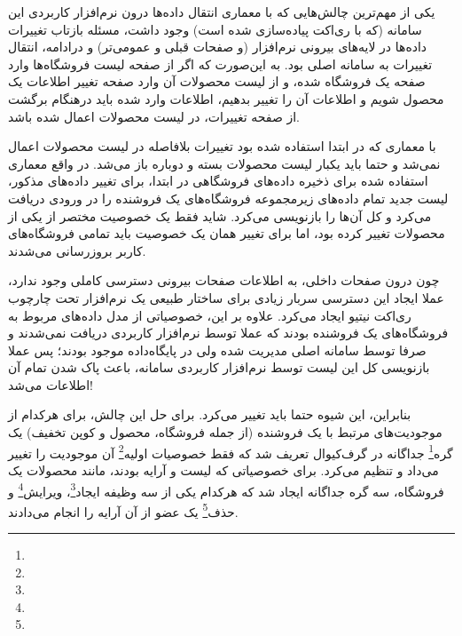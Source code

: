 

یکی از مهم‌ترین چالش‌هایی که با معماری انتقال داده‌ها درون نرم‌افزار کاربردی این سامانه (که با ری‌اکت پیاده‌سازی شده است) وجود داشت،‌ مسئله بازتاب تغییرات داده‌ها در لایه‌های بیرونی نرم‌افزار (و صفحات قبلی و عمومی‌تر) و درادامه، انتقال تغییرات به سامانه اصلی بود. به این‌صورت که اگر از صفحه لیست فروشگاه‌ها وارد صفحه یک فروشگاه شده، و از لیست محصولات آن وارد صفحه تغییر اطلاعات یک محصول شویم و اطلاعات آن را تغییر بدهیم، اطلاعات وارد شده باید درهنگام برگشت از صفحه تغییرات، در لیست محصولات اعمال شده باشد.

با معماری که در ابتدا استفاده شده بود تغییرات بلافاصله در لیست محصولات اعمال نمی‌شد و حتما باید یکبار لیست محصولات بسته و دوباره باز می‌شد. در واقع‌ معماری استفاده شده برای ذخیره داده‌های فروشگاهی در ابتدا، برای تغییر داده‌های مذکور، لیست جدید تمام داده‌های زیرمجموعه فروشگاه‌های یک فروشنده را در ورودی دریافت می‌کرد و کل آن‌ها را بازنویسی می‌کرد. شاید فقط یک خصوصیت مختصر از یکی از محصولات تغییر کرده بود، اما برای تغییر همان یک خصوصیت باید تمامی فروشگاه‌های کاربر بروزرسانی می‌شدند.

چون درون صفحات داخلی، به اطلاعات صفحات بیرونی دسترسی کاملی وجود ندارد،‌ عملا ایجاد این دسترسی سربار زیادی برای ساختار طبیعی یک نرم‌افزار تحت چارچوب ری‌اکت نیتیو ایجاد می‌کرد. علاوه بر این، خصوصیاتی از مدل داده‌های مربوط به فروشگاه‌های یک فروشنده بودند که عملا توسط نرم‌افزار کاربردی دریافت نمی‌شدند و صرفا توسط سامانه اصلی مدیریت شده ولی در پایگاه‌داده موجود بودند؛ پس عملا بازنویسی کل این لیست توسط نرم‌افزار کاربردی سامانه، باعث پاک شدن تمام آن اطلاعات می‌شد!

بنابراین، این شیوه حتما باید تغییر می‌کرد. برای حل این چالش، برای هرکدام از موجودیت‌های مرتبط با یک فروشنده (از جمله فروشگاه، محصول و کوپن تخفیف) یک گره\footnote{} جداگانه در گرف‌کیوال تعریف شد که فقط خصوصیات اولیه\footnote{} آن موجودیت را تغییر می‌داد و تنظیم می‌کرد. برای خصوصیاتی که لیست و آرایه بودند، مانند محصولات یک فروشگاه، سه گره جداگانه ایجاد شد که هرکدام یکی از سه وظیفه ایجاد\footnote{}، ویرایش\footnote{} و حذف\footnote{} یک عضو از آن آرایه را انجام می‌دادند.


